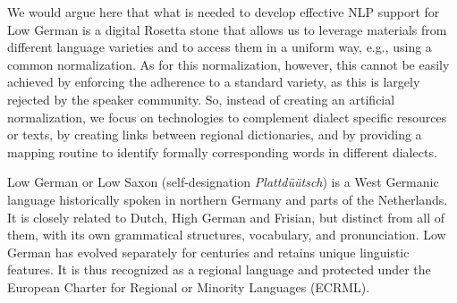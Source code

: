 \documentclass[11pt]{article}
\newcommand{\word}[1]{\textsl{#1}} %
\begin{document}
We would argue here that what is needed to develop effective NLP support for Low German is a digital Rosetta stone that allows us to leverage materials from different language varieties and to access them in a uniform way, e.g., using a common normalization. As for this normalization, however, this cannot be easily achieved by enforcing the adherence to a standard variety, as this is largely rejected by the speaker community. So, instead of creating an artificial normalization, we focus on technologies to complement dialect specific resources or texts, by creating links between regional dictionaries, and by providing a mapping routine to identify formally corresponding words in different dialects.

Low German or Low Saxon (self-designation \word{Plattdüütsch}) is a West Germanic language historically spoken in northern Germany and parts of the Netherlands. It is closely related to Dutch, High German and Frisian, but distinct from all of them, with its own grammatical structures, vocabulary, and pronunciation. Low German has evolved separately for centuries and retains unique linguistic features. It is thus recognized as a regional language and protected under the European Charter for Regional or Minority Languages (ECRML). 
\end{document}
